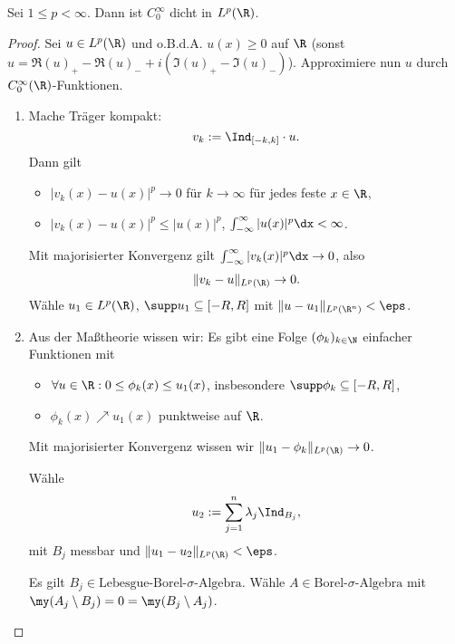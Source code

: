 \begin{st} \label{4.18}
	Sei $1 \le p < \infty$.
	Dann ist $C_0^\infty$ dicht in $L^p(\R)$.
	\begin{proof}
		Sei $u \in L^p(\R)$ und o.B.d.A. $u(x) \ge 0$ auf $\R$ (sonst $u = \Re(u)_+ - \Re(u)_- + i(\Im(u)_+ - \Im(u)_-)$).
		Approximiere nun $u$ durch $C_0^\infty(\R)$-Funktionen.
		\begin{enumerate}[1)]
			\item
				Mache Träger kompakt:
				\[
					v_k := \Ind_{[-k,k]}\cdot u.
				\]
				Dann gilt
				\begin{itemize}
					\item
						$|v_k(x)-u(x)|^p \to 0$ für $k\to \infty$ für jedes feste $x \in \R$,
					\item
						$|v_k(x)-u(x)|^p \le |u(x)|^p$, $\int_{-\infty}^\infty |u(x)|^p \dx < \infty$.
				\end{itemize}
				Mit majorisierter Konvergenz gilt $\int_{-\infty}^\infty |v_k(x)|^p \dx \to 0$, also
				\[
					\|v_k - u\|_{L^p(\R)} \to 0.
				\]
				Wähle $u_1 \in L^p(\R)$, $\supp u_1 \subset [-R,R]$ mit $\|u-u_1\|_{L^p(\R^n)} < \eps$.
			\item
				Aus der Maßtheorie wissen wir: Es gibt eine Folge $(\phi_k)_{k\in \N}$ einfacher Funktionen mit
				\begin{itemize}
					\item
						$\forall u \in \R : 0 \le \phi_k(x) \le u_1(x)$, insbesondere $\supp \phi_k \subset [-R,R]$,
					\item
						$\phi_k(x) \nearrow u_1(x)$ punktweise auf $\R$.
				\end{itemize}
				Mit majorisierter Konvergenz wissen wir $\|u_1 - \phi_k\|_{L^p(\R)} \to 0$.

				Wähle 
				\[
					u_2 := \sum_{j=1}^n \lambda_j \Ind_{B_j},
				\]
				mit $B_j$ messbar und $\|u_1-u_2\|_{L^p(\R)} < \eps$.

				Es gilt $B_j \in \text{Lebesgue-Borel-$\sigma$-Algebra}$.
				Wähle $A \in \text{Borel-$\sigma$-Algebra}$ mit $\my(A_j \setminus B_j) = 0 = \my(B_j \setminus A_j)$.


\end{enumerate}
\end{proof}
\end{st}
